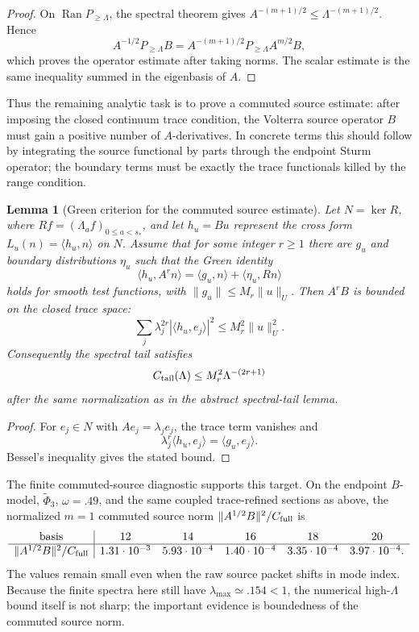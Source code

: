 \documentclass[11pt]{article}
\newtheorem{lemma}[theorem]{Lemma}
\begin{document}
\begin{proof}
On \(\operatorname{Ran}P_{\ge\Lambda}\), the spectral theorem gives
\(A^{-(m+1)/2}\le\Lambda^{-(m+1)/2}\).  Hence
\[
  A^{-1/2}P_{\ge\Lambda}B
  =
  A^{-(m+1)/2}P_{\ge\Lambda}A^{m/2}B,
\]
which proves the operator estimate after taking norms.  The scalar estimate is
the same inequality summed in the eigenbasis of \(A\).
\end{proof}

Thus the remaining analytic task is to prove a commuted source estimate:
after imposing the closed continuum trace condition, the Volterra source
operator \(B\) must gain a positive number of \(A\)-derivatives.  In concrete
terms this should follow by integrating the source functional by parts through
the endpoint Sturm operator; the boundary terms must be exactly the trace
functionals killed by the range condition.

\begin{lemma}[Green criterion for the commuted source estimate]
Let \(N=\ker R\), where \(R f=(\Lambda_a f)_{0\le a<s_*}\), and let
\(h_u=Bu\) represent the cross form \(L_u(n)=\langle h_u,n\rangle\) on \(N\).
Assume that for some integer \(r\ge1\) there are \(g_u\) and boundary
distributions \(\eta_u\) such that the Green identity
\[
  \langle h_u,A^r n\rangle
  =
  \langle g_u,n\rangle+\langle \eta_u,Rn\rangle
\]
holds for smooth test functions, with
\(\|g_u\|\le M_r\|u\|_U\).  Then \(A^rB\) is bounded on the closed trace space:
\[
  \sum_j \lambda_j^{2r}|\langle h_u,e_j\rangle|^2
  \le M_r^2\|u\|_U^2 .
\]
Consequently the spectral tail satisfies
\[
  C_{\rm tail}(\Lambda)
  \le M_r^2\Lambda^{-(2r+1)}
\]
after the same normalization as in the abstract spectral-tail lemma.
\end{lemma}

\begin{proof}
For \(e_j\in N\) with \(A e_j=\lambda_j e_j\), the trace term vanishes and
\[
  \lambda_j^r\langle h_u,e_j\rangle=\langle g_u,e_j\rangle .
\]
Bessel's inequality gives the stated bound.
\end{proof}

The finite commuted-source diagnostic supports this target.  On the endpoint
\(B\)-model, \(\widetilde\Phi_3\), \(\omega=.49\), and the same coupled
trace-refined sections as above, the normalized \(m=1\) commuted source norm
\(\|A^{1/2}B\|^2/C_{\rm full}\) is
\[
\begin{array}{c|ccccc}
{\rm basis} & 12 & 14 & 16 & 18 & 20\\
\hline
\|A^{1/2}B\|^2/C_{\rm full}
&1.31\cdot10^{-3}&5.93\cdot10^{-4}&1.40\cdot10^{-4}
&3.35\cdot10^{-4}&3.97\cdot10^{-4}.
\end{array}
\]
The values remain small even when the raw source packet shifts in mode index.
Because the finite spectra here still have \(\lambda_{\max}\simeq.154<1\),
the numerical high-\(\Lambda\) bound itself is not sharp; the important
evidence is boundedness of the commuted source norm.
\end{document}
